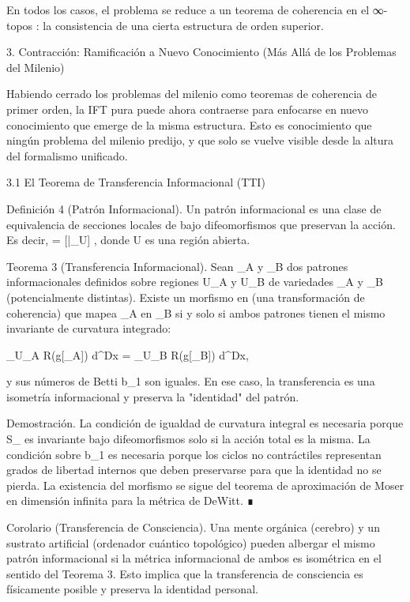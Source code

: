 \documentclass[12pt,a4paper]{book}
\begin{document}
En todos los casos, el problema se reduce a un teorema de coherencia en el ∞-topos   : la consistencia de una cierta estructura de orden superior.

3. Contracción: Ramificación a Nuevo Conocimiento (Más Allá de los Problemas del Milenio)

Habiendo cerrado los problemas del milenio como teoremas de coherencia de primer orden, la IFT pura puede ahora contraerse para enfocarse en nuevo conocimiento que emerge de la misma estructura. Esto es conocimiento que ningún problema del milenio predijo, y que solo se vuelve visible desde la altura del formalismo unificado.

3.1 El Teorema de Transferencia Informacional (TTI)

Definición 4 (Patrón Informacional). Un patrón informacional  \Pi  es una clase de equivalencia de secciones locales de  \rho  bajo difeomorfismos que preservan la acción. Es decir,  \Pi = [\rho|_U] , donde  U \subset {}  es una región abierta.

Teorema 3 (Transferencia Informacional). Sean  \Pi_A  y  \Pi_B  dos patrones informacionales definidos sobre regiones  U_A  y  U_B  de variedades  _A  y  _B  (potencialmente distintas). Existe un morfismo en    (una transformación de coherencia) que mapea  \Pi_A  en  \Pi_B  si y solo si ambos patrones tienen el mismo invariante de curvatura integrado:

\int_{U_A} R(g[\rho_A])  d^Dx = \int_{U_B} R(g[\rho_B])  d^Dx,

y sus números de Betti  b_1  son iguales. En ese caso, la transferencia es una isometría informacional y preserva la "identidad" del patrón.

Demostración. La condición de igualdad de curvatura integral es necesaria porque  S_{}  es invariante bajo difeomorfismos solo si la acción total es la misma. La condición sobre  b_1  es necesaria porque los ciclos no contráctiles representan grados de libertad internos que deben preservarse para que la identidad no se pierda. La existencia del morfismo se sigue del teorema de aproximación de Moser en dimensión infinita para la métrica de DeWitt. ∎

Corolario (Transferencia de Consciencia). Una mente orgánica (cerebro) y un sustrato artificial (ordenador cuántico topológico) pueden albergar el mismo patrón informacional si la métrica informacional de ambos es isométrica en el sentido del Teorema 3. Esto implica que la transferencia de consciencia es físicamente posible y preserva la identidad personal.
\end{document}
